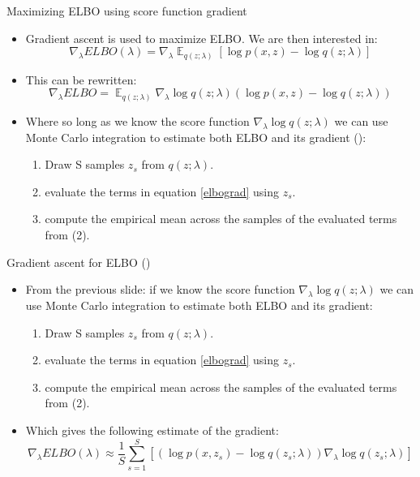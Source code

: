 \documentclass{beamer}
\begin{document}
\begin{frame}{Maximizing ELBO using score function gradient}
  \begin{itemize}
  \item Gradient ascent is used to maximize ELBO. We are then interested in:
    \[\nabla_\lambda ELBO(\lambda) = \nabla_\lambda \mathop{\mathbb{E}}_{q(z ; \lambda)} \left[\log p(x, z) - \log q(z ; \lambda) \right]\]
  \item This can be rewritten:
    \begin{equation}
      \label{elbograd}
      \nabla_\lambda ELBO =  \mathop{\mathbb{E}}_{q(z ; \lambda)} \nabla_\lambda \log q(z ; \lambda) \left(\log p(x, z) - \log q(z ; \lambda) \right)
    \end{equation}
  \item Where so long as we know the score function $\nabla_\lambda \log q(z ; \lambda)$ we can use Monte Carlo integration to estimate both ELBO and its gradient (\cite{ranganath2014}):
    \begin{enumerate}
    \item Draw S samples $z_s$ from  $q(z ; \lambda)$.
    \item evaluate the terms in equation \ref{elbograd} using $z_s$.
    \item compute the empirical mean across the samples of the evaluated terms from (2).
    \end{enumerate}
  \end{itemize}
\end{frame}

\begin{frame}{Gradient ascent for ELBO (\cite{ranganath2014, tran2016})}
  \begin{itemize}
  \item From the previous slide: if we know the score function $\nabla_\lambda \log q(z ; \lambda)$ we can use Monte Carlo integration to estimate both ELBO and its gradient:
    \begin{enumerate}
    \item Draw S samples $z_s$ from  $q(z ; \lambda)$.
    \item evaluate the terms in equation \ref{elbograd} using $z_s$.
    \item compute the empirical mean across the samples of the evaluated terms from (2).
    \end{enumerate}
  \item  Which gives the following estimate of the gradient:
      \[\nabla_\lambda ELBO(\lambda) \approx \frac{1}{S} \sum_{s=1}^{S} \left[ \left( \log p(x, z_s) - \log q(z_s; \lambda)\right) \nabla_\lambda \log q(z_s; \lambda) \right]\]
  \end{itemize}
\end{frame}
\end{document}
